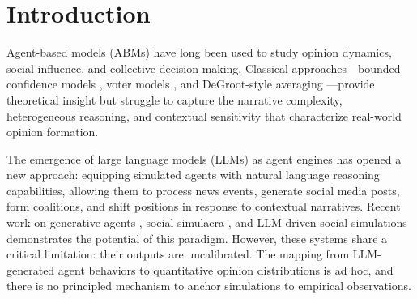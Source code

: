 \documentclass[12pt]{article}
\begin{document}
\begin{abstract}
\textbf{Version 2.5 adds a null-baseline benchmarking layer.} Four standard forecasters (naive persistence, running mean, OLS linear trend, AR(1)) are evaluated against the same 43 empirical trajectories using the Diebold--Mariano test with the Harvey--Leybourne--Newbold small-sample correction. On normalized support, naive persistence is a surprisingly strong baseline (mean RMSE~$= 0.038$, i.e.\ 3.8~pp), and no single baseline reliably dominates it --- OLS linear trend beats persistence significantly ($p < 0.05$) on only 4/43 scenarios for support and 6/43 for signed position. Domain-stratified skill is heterogeneous: political polling is easiest to forecast (persistence RMSE~$= 0.012$), while financial scenarios are the hardest ($0.063$), a $5\times$ spread that any calibrated model must internalize. A residual-bootstrap coverage calculator provides a model-free complement to the logit-space credible intervals of v2.4. The full corpus covers 25/140 cells of a 7~(domain) $\times$~5~(region) $\times$~4~(tension) diversity matrix with no axis empty. The benchmarking package is released as a standalone module (\texttt{benchmarks/}) with 103 automated tests and a command-line runner, establishing a reproducible skill floor that any future calibrated sim must clear to justify its complexity.
\end{abstract}

\section{Introduction}

Agent-based models (ABMs) have long been used to study opinion dynamics, social influence, and collective decision-making. Classical approaches---bounded confidence models \citep{hegselmann2002}, voter models \citep{holley1975}, and DeGroot-style averaging \citep{degroot1974}---provide theoretical insight but struggle to capture the narrative complexity, heterogeneous reasoning, and contextual sensitivity that characterize real-world opinion formation.

The emergence of large language models (LLMs) as agent engines has opened a new approach: equipping simulated agents with natural language reasoning capabilities, allowing them to process news events, generate social media posts, form coalitions, and shift positions in response to contextual narratives. Recent work on generative agents \citep{park2023}, social simulacra \citep{park2022}, and LLM-driven social simulations \citep{gao2023} demonstrates the potential of this paradigm. However, these systems share a critical limitation: their outputs are uncalibrated. The mapping from LLM-generated agent behaviors to quantitative opinion distributions is ad hoc, and there is no principled mechanism to anchor simulations to empirical observations.
\end{document}
